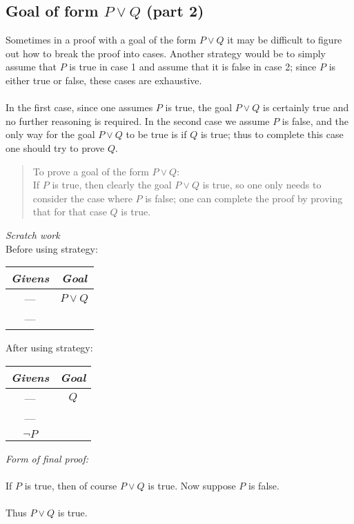 \documentclass{report}
\theoremstyle{definition}
\begin{document}
\subsection{Goal of form $P\lor Q$ (part 2)}
Sometimes in a proof with a goal of the form $P\lor Q$ it may be difficult to figure out how to break the proof into cases.
Another strategy would be to simply assume that $P$ is true in case 1 and assume that it is false in case 2; since $P$ is either true or false, these cases are exhaustive.\\
\vspace{1mm}\\
In the first case, since one assumes $P$ is true, the goal $P\lor Q$ is certainly true and no further reasoning is required. In the second case we assume $P$ is false, and the only way for the 
goal $P\lor Q$ to be true is if $Q$ is true; thus to complete this case one should try to prove $Q$.
\begin{quote}
To prove a goal of the form $P\lor Q$:\\
If $P$ is true, then clearly the goal $P\lor Q$ is true, so one only needs to consider the case where $P$ is false; one can complete the proof by proving that for that case $Q$ is true.
\end{quote}
\textit{Scratch work}\\
Before using strategy:
\begin{center}
\begin{tabular}{c|c}
\textit{Givens}&\textit{Goal}\\
\hline
---&$P\lor Q$\\
---&
\end{tabular}
\end{center}
After using strategy:
\begin{center}
\begin{tabular}{c|c}
\textit{Givens}&\textit{Goal}\\
\hline
---&$Q$\\
---&\\
$\neg P$&
\end{tabular}
\end{center}
\textit{Form of final proof:}\\
\vspace{1mm}\\
\indent If $P$ is true, then of course $P\lor Q$ is true. Now suppose $P$ is false.\\
\indent{}\\
\indent Thus $P\lor Q$ is true.\\
\end{document}
